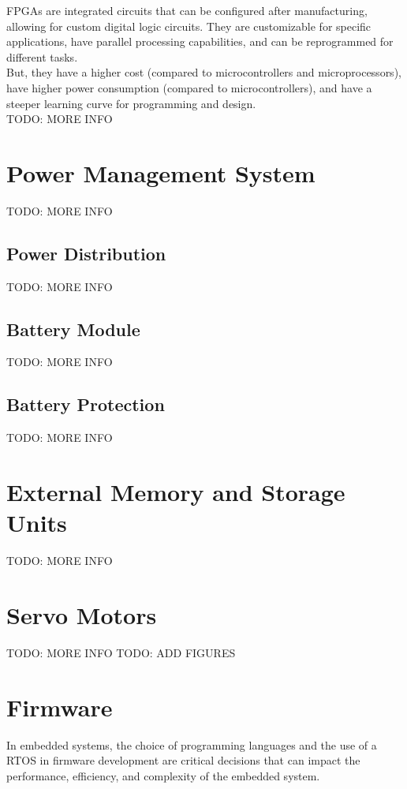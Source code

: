 \glspl{FPGA} are integrated circuits that can be configured after manufacturing, allowing for custom digital logic circuits. 
They are customizable for specific applications, have parallel processing capabilities, and can be reprogrammed for different tasks.\\
But, they have a higher cost (compared to microcontrollers and microprocessors), have higher power consumption (compared to microcontrollers), and have a steeper learning curve for programming and design.\\

TODO: MORE INFO

\section{Power Management System}
TODO: MORE INFO

\subsection{Power Distribution}
TODO: MORE INFO

\subsection{Battery Module}
TODO: MORE INFO

\subsection{Battery Protection}
TODO: MORE INFO


\section{External Memory and Storage Units}
TODO: MORE INFO


\section{Servo Motors}
TODO: MORE INFO
TODO: ADD FIGURES

\section{Firmware}
In embedded systems, the choice of programming languages and the use of a \gls{RTOS} in firmware development are critical decisions that can impact the performance, efficiency, and complexity of the embedded system.\\

